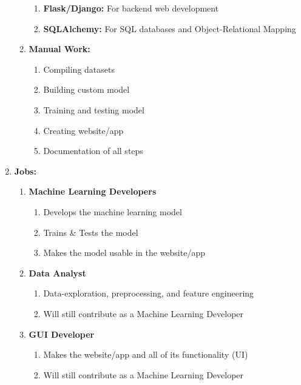\documentclass{article}
\begin{document}
\begin{enumerate}
\begin{enumerate}
\begin{enumerate}
                \item \textbf{Flask/Django:} For backend web development
                \item \textbf{SQLAlchemy:} For SQL databases and Object-Relational Mapping
            \end{enumerate}
            \item \textbf{Manual Work:}
            \begin{enumerate}
                \item Compiling datasets
                \item Building custom model
                \item Training and testing model
                \item Creating website/app
                \item Documentation of all steps
            \end{enumerate}
        \end{enumerate}
    \item \textbf{Jobs:}
    \begin{enumerate}
        \item \textbf{Machine Learning Developers}
        \begin{enumerate}
            \item Develops the machine learning model
            \item Trains \& Tests the model
            \item Makes the model usable in the website/app
        \end{enumerate}
        \item \textbf{Data Analyst}
        \begin{enumerate}
            \item Data-exploration, preprocessing, and feature engineering
            \item Will still contribute as a Machine Learning Developer
        \end{enumerate}
        \item \textbf{GUI Developer}
        \begin{enumerate}
            \item Makes the website/app and all of its functionality (UI)
            \item Will still contribute as a Machine Learning Developer
        \end{enumerate}
    \end{enumerate}
\end{enumerate}
\end{document}
